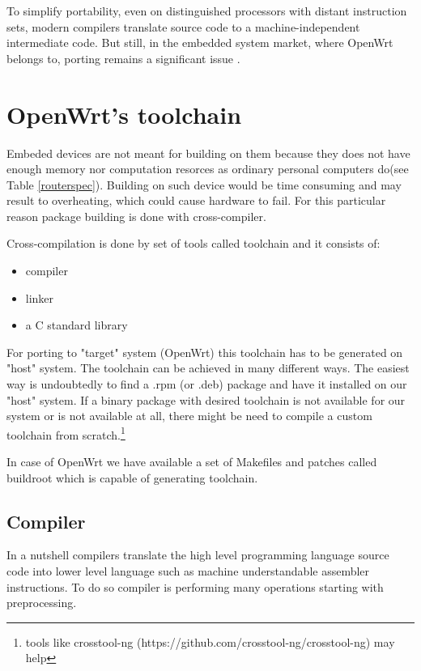 To simplify portability, even on distinguished processors with distant instruction sets, modern compilers translate source code to a machine-independent intermediate code.
But still, in the embedded system market, where OpenWrt belongs to, porting remains a significant issue \cite{porting_software}.

\section{OpenWrt's toolchain}

Embeded devices are not meant for building on them because they does not have enough memory nor computation resorces as ordinary personal computers do(see Table \ref{routerspec}).
Building on such device would be time consuming and may result to overheating, which could cause hardware to fail.
For this particular reason package building is done with cross-compiler.

Cross-compilation is done by set of tools called toolchain and it consists of:
\begin{itemize}
    \item compiler
    \item linker
    \item a C standard library
\end{itemize}
For porting to "target" system (OpenWrt) this toolchain has to be generated on "host" system.
The toolchain can be achieved in many different ways.
The easiest way is undoubtedly to find a .rpm (or .deb) package and have it installed on our "host" system.
If a binary package with desired toolchain is not available for our system or is not available at all, there might be need to compile a custom toolchain from scratch.\footnote{tools like crosstool-ng (https://github.com/crosstool-ng/crosstool-ng) may help}

In case of OpenWrt we have available a set of Makefiles and patches called buildroot which is capable of generating toolchain.

\subsection{Compiler} 

In a nutshell compilers translate the high level programming language source code into lower level language such as machine understandable assembler instructions.
To do so compiler is performing many operations starting with preprocessing.

